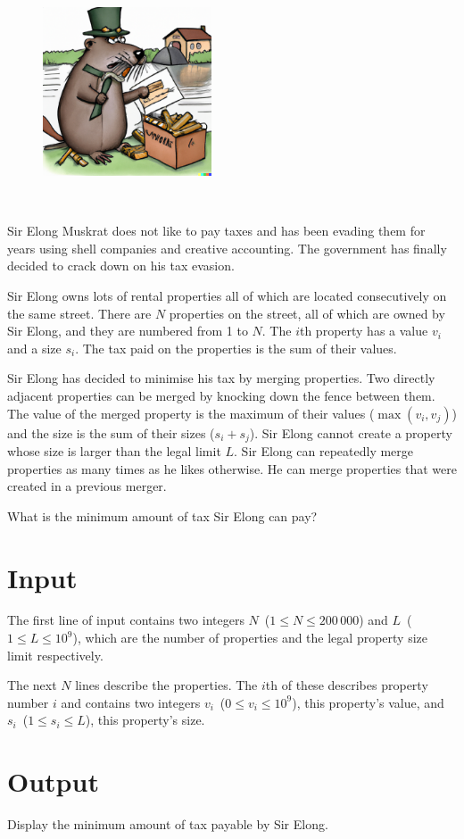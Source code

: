 
\begin{figure}
 \includegraphics[width=50mm]{img.png}
\end{figure}
~

Sir Elong Muskrat does not like to pay taxes and has been evading them for years using shell companies and creative accounting. The government has finally decided to crack down on his tax evasion.

Sir Elong owns lots of rental properties all of which are located consecutively on the same street. There are $N$ properties on the street, all of which are owned by Sir Elong, and they are numbered from 1 to $N$. The $i$th property has a value $v_i$ and a size $s_i$. The tax paid on the properties is the sum of their values.

Sir Elong has decided to minimise his tax by merging properties. Two directly adjacent properties can be merged by knocking down the fence between them. The value of the merged property is the maximum of their values ($\max(v_i, v_j)$) and the size is the sum of their sizes ($s_i + s_j$). Sir Elong cannot create a property whose size is larger than the legal limit $L$. Sir Elong can repeatedly merge properties as many times as he likes otherwise. He can merge properties that were created in a previous merger.

What is the minimum amount of tax Sir Elong can pay?


\section*{Input}

The first line of input contains two integers $N$~($1 \leq N \leq 200\,000$) and $L$~($1 \leq L \leq 10^9$), which are the number of properties and the legal property size limit respectively.

The next $N$ lines describe the properties. The $i$th of these describes property number $i$ and contains two integers $v_i$~($0 \leq v_i \leq 10^9$), this property's value, and $s_i$~($1 \leq s_i \leq L$), this property's size.


\section*{Output}

Display the minimum amount of tax payable by Sir Elong.

